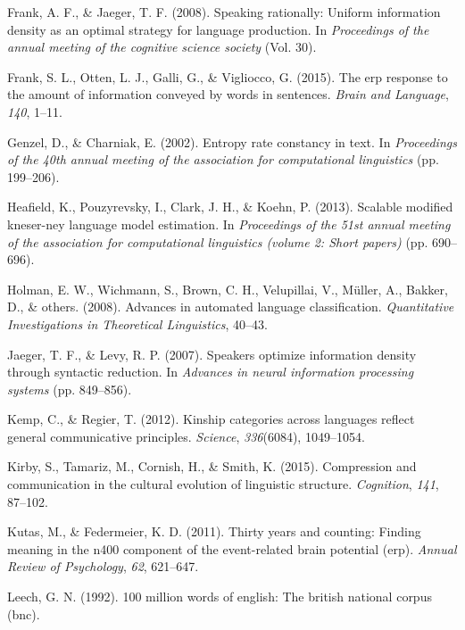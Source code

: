 \documentclass[man,floatsintext]{apa6}
\begin{document}
\leavevmode\hypertarget{ref-frank2008}{}%
Frank, A. F., \& Jaeger, T. F. (2008). Speaking rationally: Uniform information density as an optimal strategy for language production. In \emph{Proceedings of the annual meeting of the cognitive science society} (Vol. 30).

\leavevmode\hypertarget{ref-frank2015}{}%
Frank, S. L., Otten, L. J., Galli, G., \& Vigliocco, G. (2015). The erp response to the amount of information conveyed by words in sentences. \emph{Brain and Language}, \emph{140}, 1--11.

\leavevmode\hypertarget{ref-genzel2002}{}%
Genzel, D., \& Charniak, E. (2002). Entropy rate constancy in text. In \emph{Proceedings of the 40th annual meeting of the association for computational linguistics} (pp. 199--206).

\leavevmode\hypertarget{ref-heafield2013}{}%
Heafield, K., Pouzyrevsky, I., Clark, J. H., \& Koehn, P. (2013). Scalable modified kneser-ney language model estimation. In \emph{Proceedings of the 51st annual meeting of the association for computational linguistics (volume 2: Short papers)} (pp. 690--696).

\leavevmode\hypertarget{ref-holman2008}{}%
Holman, E. W., Wichmann, S., Brown, C. H., Velupillai, V., Müller, A., Bakker, D., \& others. (2008). Advances in automated language classification. \emph{Quantitative Investigations in Theoretical Linguistics}, 40--43.

\leavevmode\hypertarget{ref-jaeger2007}{}%
Jaeger, T. F., \& Levy, R. P. (2007). Speakers optimize information density through syntactic reduction. In \emph{Advances in neural information processing systems} (pp. 849--856).

\leavevmode\hypertarget{ref-kemp2012kinship}{}%
Kemp, C., \& Regier, T. (2012). Kinship categories across languages reflect general communicative principles. \emph{Science}, \emph{336}(6084), 1049--1054.

\leavevmode\hypertarget{ref-kirby2015compression}{}%
Kirby, S., Tamariz, M., Cornish, H., \& Smith, K. (2015). Compression and communication in the cultural evolution of linguistic structure. \emph{Cognition}, \emph{141}, 87--102.

\leavevmode\hypertarget{ref-kutas2011}{}%
Kutas, M., \& Federmeier, K. D. (2011). Thirty years and counting: Finding meaning in the n400 component of the event-related brain potential (erp). \emph{Annual Review of Psychology}, \emph{62}, 621--647.

\leavevmode\hypertarget{ref-leech1992}{}%
Leech, G. N. (1992). 100 million words of english: The british national corpus (bnc).
\end{document}
